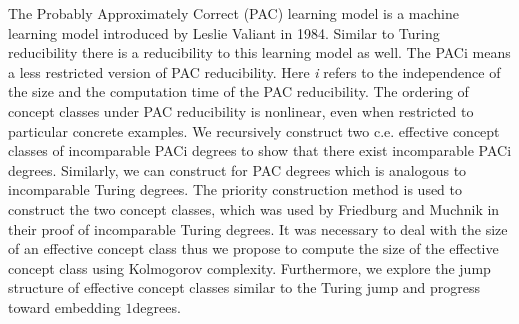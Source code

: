 \documentclass[bsl,meeting]{asl}
\newcommand{\NP}{}
\begin{document}
\thispagestyle{empty}


\NP  
{}


The Probably Approximately Correct (PAC) learning model is a machine learning model introduced by Leslie Valiant in 1984. Similar to Turing reducibility there is a reducibility to this learning model as well. The PACi means a less restricted version of PAC reducibility. Here \textit{i} refers to the independence of the size and the computation time of the PAC reducibility.  
The ordering of concept classes under PAC reducibility is nonlinear, even when restricted to particular concrete examples. We recursively construct two c.e. effective concept classes of incomparable PACi degrees to show that there exist incomparable PACi degrees. Similarly, we can construct for PAC degrees which is analogous to incomparable Turing degrees. The priority construction method is used to construct the two concept classes, which was used by Friedburg and Muchnik in their proof of incomparable Turing degrees.  It was necessary to deal with the size of an effective concept class thus we propose to compute the size of the effective concept class using Kolmogorov complexity. Furthermore, we explore the jump structure of effective concept classes similar to the Turing jump and progress toward embedding $1$degrees.
\end{document}
